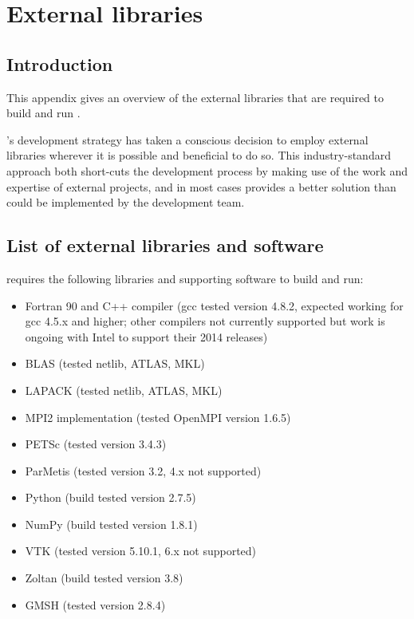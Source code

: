 \chapter{External libraries}\label{chap:external}

\section{Introduction}

This appendix gives an overview of the external libraries that are required to
build and run \fluidity.

\fluidity's development strategy has taken a conscious decision to employ
external libraries wherever it is possible and beneficial to do so. This
industry-standard approach both short-cuts the development process by making
use of the work and expertise of external projects, and in most cases provides
a better solution than could be implemented by the \fluidity development team.

\section{List of external libraries and software}
\label{sec:required_libraries_list}

\fluidity requires the following libraries and supporting software to build and
run:

\begin{itemize}
\item Fortran 90 and C++ compiler (gcc tested version 4.8.2, expected working for gcc 4.5.x and higher; other compilers not currently supported but work is ongoing with Intel to support their 2014 releases)
\item BLAS (tested netlib, ATLAS, MKL)
\item LAPACK (tested netlib, ATLAS, MKL)
\item MPI2 implementation (tested OpenMPI version 1.6.5)
\item PETSc (tested version 3.4.3)
\item ParMetis (tested version 3.2, 4.x not supported)
\item Python (build tested version 2.7.5) 
\item NumPy (build tested version 1.8.1)
\item VTK (tested version 5.10.1, 6.x not supported)
\item Zoltan (build tested version 3.8)
\item GMSH (tested version 2.8.4)
\end{itemize}

